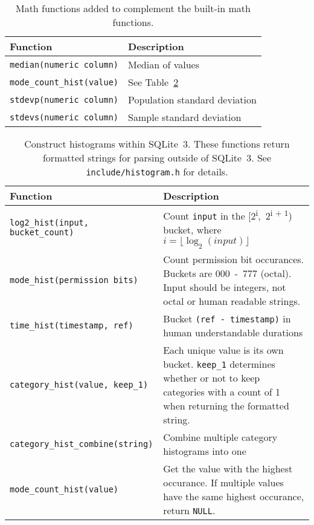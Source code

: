 \begin{table}[H]
  \centering
  \caption{\label{tab:sqlmath} Math functions added to complement the built-in math functions.}
  \begin{tabularx}{\textwidth}{| l | X |}
    \hline
    Function & Description \\
    \hline
    \texttt{median(numeric column)} & Median of values \\
    \hline
    \texttt{mode\_count\_hist(value)} & See Table~\ref{tab:sqlhist} \\
    \hline
    \texttt{stdevp(numeric column)} & Population standard deviation \\
    \hline
    \texttt{stdevs(numeric column)} & Sample standard deviation \\
    \hline
  \end{tabularx}
\end{table}

\begin{table}[H]
  \centering
  \caption{\label{tab:sqlhist}Construct histograms within SQLite~3. These functions return formatted strings for parsing outside of SQLite~3. See \texttt{include/histogram.h} for details.}
  \begin{tabularx}{\textwidth}{| l | X | }
    \hline
    Function & Description \\
    \hline
    \texttt{log2\_hist(input, bucket\_count)} & Count \texttt{input} in the [2\textsuperscript{i},~2\textsuperscript{i + 1}) bucket, where $i = \lfloor \log_2 (input) \rfloor$ \\
    \hline
    \texttt{mode\_hist(permission bits)} & Count permission bit occurances. Buckets are 000~-~777 (octal). Input should be integers, not octal or human readable strings. \\
    \hline
    \texttt{time\_hist(timestamp, ref)} & Bucket \texttt{(ref - timestamp)} in human understandable durations \\
    \hline
    \texttt{category\_hist(value, keep\_1)} & Each unique value is its own bucket. \texttt{keep\_1} determines whether or not to keep categories with a count of 1 when returning the formatted string. \\
    \hline
    \texttt{category\_hist\_combine(string)} & Combine multiple category histograms into one \\
    \hline
    \texttt{mode\_count\_hist(value)} & Get the value with the highest occurance. If multiple values have the same highest occurance, return \texttt{NULL}. \\
    \hline
  \end{tabularx}
\end{table}

